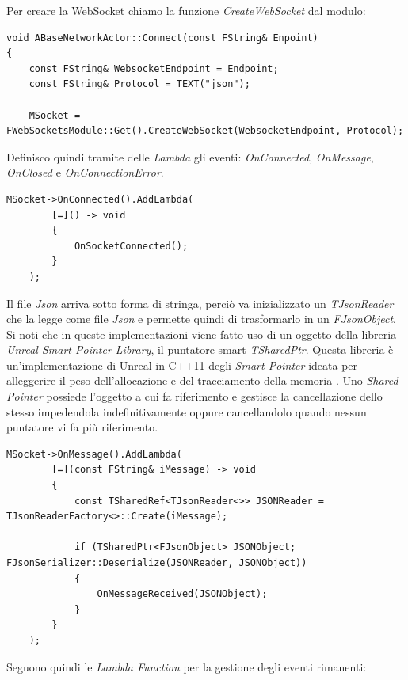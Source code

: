 Per creare la WebSocket chiamo la funzione \textit{CreateWebSocket} dal modulo:

\begin{lstlisting}[caption = Sezione del file source di ABaseNetworkActor dove viene creata la WebSocket]
void ABaseNetworkActor::Connect(const FString& Enpoint)
{
    const FString& WebsocketEndpoint = Endpoint;
    const FString& Protocol = TEXT("json");

	MSocket = FWebSocketsModule::Get().CreateWebSocket(WebsocketEndpoint, Protocol);
\end{lstlisting}

%
%
Definisco quindi tramite delle \textit{Lambda} gli eventi: \textit{OnConnected}, \textit{OnMessage}, \textit{OnClosed} e \textit{OnConnectionError}.

\begin{lstlisting}[firstnumber=7]
    MSocket->OnConnected().AddLambda(
		[=]() -> void
		{
			OnSocketConnected();
		}
	);
\end{lstlisting}

Il file \textit{Json} arriva sotto forma di stringa, perciò va inizializzato un \textit{TJsonReader} che la legge come file \textit{Json} e permette quindi di trasformarlo in un \textit{FJsonObject}.
%
Si noti che in queste implementazioni viene fatto uso di un oggetto della libreria \textit{Unreal Smart Pointer Library}, il puntatore smart \textit{TSharedPtr}.
%
Questa libreria è un'implementazione di Unreal in C++11 degli \textit{Smart Pointer} ideata per alleggerire il peso dell'allocazione e del tracciamento della memoria \cite{USmartPointerLibrary}.
%
Uno \textit{Shared Pointer} possiede l'oggetto a cui fa riferimento e gestisce la cancellazione dello stesso impedendola indefinitivamente oppure cancellandolo quando nessun puntatore vi fa più riferimento.

\begin{lstlisting}[firstnumber=13, caption=La funzione che gestisce i messaggi in entrata alla WebSocket]
	MSocket->OnMessage().AddLambda(
		[=](const FString& iMessage) -> void
		{
			const TSharedRef<TJsonReader<>> JSONReader = TJsonReaderFactory<>::Create(iMessage);

			if (TSharedPtr<FJsonObject> JSONObject; FJsonSerializer::Deserialize(JSONReader, JSONObject))
			{
				OnMessageReceived(JSONObject);
			}
		}
	);
\end{lstlisting}

Seguono quindi le \textit{Lambda Function} per la gestione degli eventi rimanenti:

